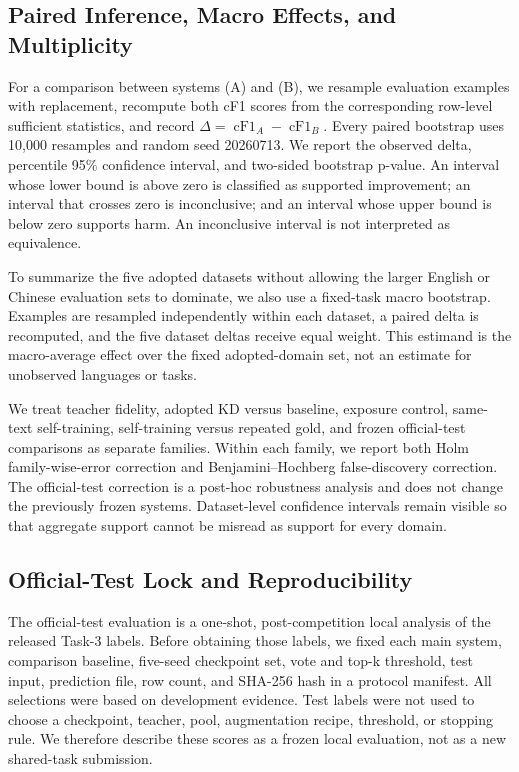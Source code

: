 \subsection{Paired Inference, Macro Effects, and
Multiplicity}\label{paired-inference-macro-effects-and-multiplicity}

For a comparison between systems (A) and (B), we resample evaluation
examples with replacement, recompute both cF1 scores from the
corresponding row-level sufficient statistics, and record
\(\Delta=\operatorname{cF1}_A-
\operatorname{cF1}_B\). Every paired bootstrap uses 10,000 resamples and
random seed 20260713. We report the observed delta, percentile 95\%
confidence interval, and two-sided bootstrap p-value. An interval whose
lower bound is above zero is classified as supported improvement; an
interval that crosses zero is inconclusive; and an interval whose upper
bound is below zero supports harm. An inconclusive interval is not
interpreted as equivalence.

To summarize the five adopted datasets without allowing the larger
English or Chinese evaluation sets to dominate, we also use a fixed-task
macro bootstrap. Examples are resampled independently within each
dataset, a paired delta is recomputed, and the five dataset deltas
receive equal weight. This estimand is the macro-average effect over the
fixed adopted-domain set, not an estimate for unobserved languages or
tasks.

We treat teacher fidelity, adopted KD versus baseline, exposure control,
same-text self-training, self-training versus repeated gold, and frozen
official-test comparisons as separate families. Within each family, we
report both Holm family-wise-error correction and Benjamini--Hochberg
false-discovery correction. The official-test correction is a post-hoc
robustness analysis and does not change the previously frozen systems.
Dataset-level confidence intervals remain visible so that aggregate
support cannot be misread as support for every domain.

\subsection{Official-Test Lock and
Reproducibility}\label{official-test-lock-and-reproducibility}

The official-test evaluation is a one-shot, post-competition local
analysis of the released Task-3 labels. Before obtaining those labels,
we fixed each main system, comparison baseline, five-seed checkpoint
set, vote and top-k threshold, test input, prediction file, row count,
and SHA-256 hash in a protocol manifest. All selections were based on
development evidence. Test labels were not used to choose a checkpoint,
teacher, pool, augmentation recipe, threshold, or stopping rule. We
therefore describe these scores as a frozen local evaluation, not as a
new shared-task submission.

